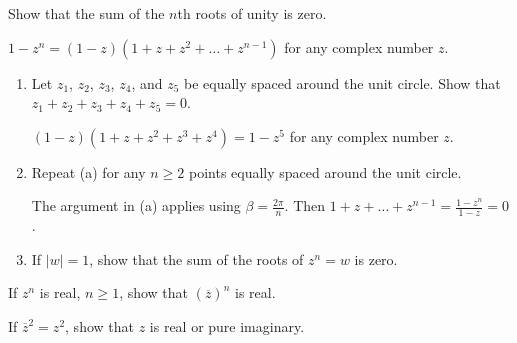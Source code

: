 \documentclass{ximera}
\begin{document}
\begin{problem}\label{prb:A.25}
Show that the sum of the $n$th roots of unity is zero. 

\begin{hint}
$1 - z^{n} = (1 - z)(1 + z + z^{2} + \dots  + z^{n-1})$ for any complex number $z$.
\end{hint}
\end{problem}

\begin{problem}\label{prb:A.26}
\begin{enumerate}
\item Let $z_{1}$, $z_{2}$, $z_{3}$, $z_{4}$, and $z_{5}$ be equally spaced around the unit circle. Show that $z_{1} + z_{2} + z_{3} + z_{4} + z_{5} = 0$.

\begin{hint}
$(1 - z)(1 + z + z^{2} + z^{3} + z^{4}) = 1 - z^{5}$ for any complex number $z$.
\end{hint}

\item Repeat (a) for any $n \geq 2$ points equally spaced around the unit circle.

\begin{hint}
The argument in (a) applies using $\beta = \frac{2\pi}{n}$.
 Then $ 1 + z + \ldots + z^{n-1} = \frac{1-z^n}{1-z}=0$.
\end{hint}

\item If $|w| = 1$, show that the sum of the roots of $z^n = w$ is zero.

\end{enumerate}
\end{problem}

\begin{problem}\label{prb:A.27}
If $z^n$ is real, $n \geq 1$, show that $(\overline{z})^{n}$ is real.
\end{problem}

\begin{problem}\label{prb:A.28}
If $\overline{z}^2 = z^{2}$, show that $z$ is real or pure imaginary.
\end{problem}
\end{document}
